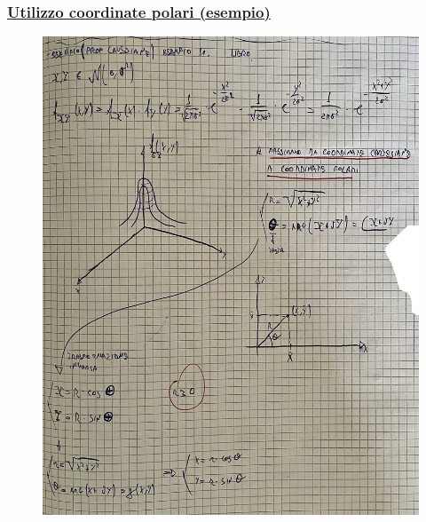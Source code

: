 \documentclass{article}
\begin{document}
\subsubsection{\underline{Utilizzo coordinate polari (esempio)}}
\begin{figure}[ht]
\centering
\includegraphics[scale=0.16]{images/82.jpeg}
\end{figure} 
\end{document}
